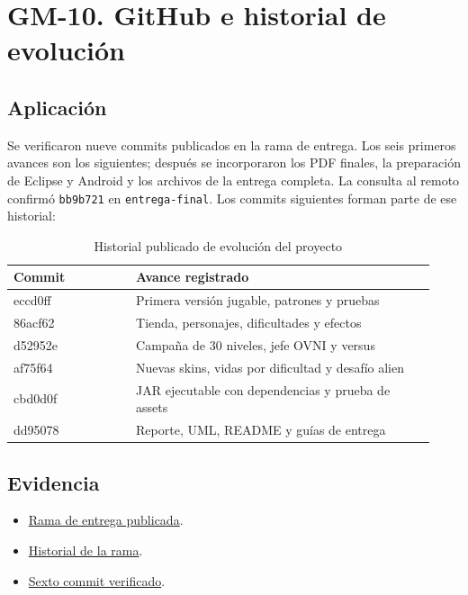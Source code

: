 \section{GM-10. GitHub e historial de evolución}

\subsection*{Aplicación}

Se verificaron nueve commits publicados en la rama de entrega. Los seis primeros avances son los siguientes; después se incorporaron los PDF finales, la preparación de Eclipse y Android y los archivos de la entrega completa. La consulta al remoto confirmó \texttt{bb9b721} en \texttt{entrega-final}. Los commits siguientes forman parte de ese historial:

{\small
\begin{longtable}{p{0.27\linewidth}p{0.66\linewidth}}
\caption{Historial publicado de evolución del proyecto}\\
\toprule
Commit & Avance registrado \\
\midrule
\endhead
eccd0ff & Primera versión jugable, patrones y pruebas \\
86acf62 & Tienda, personajes, dificultades y efectos \\
d52952e & Campaña de 30 niveles, jefe OVNI y versus \\
af75f64 & Nuevas skins, vidas por dificultad y desafío alien \\
cbd0d0f & JAR ejecutable con dependencias y prueba de assets \\
dd95078 & Reporte, UML, README y guías de entrega \\
\bottomrule
\end{longtable}
}

\subsection*{Evidencia}

\begin{itemize}
\item \href{https://github.com/maverick1006/Proyecto-Game-LLuvia-/tree/entrega-final}{Rama de entrega publicada}.
\item \href{https://github.com/maverick1006/Proyecto-Game-LLuvia-/commits/entrega-final/}{Historial de la rama}.
\item \href{https://github.com/maverick1006/Proyecto-Game-LLuvia-/commit/dd95078a1b2b7f9219c420c02deb36337b5b77ef}{Sexto commit verificado}.
\end{itemize}

